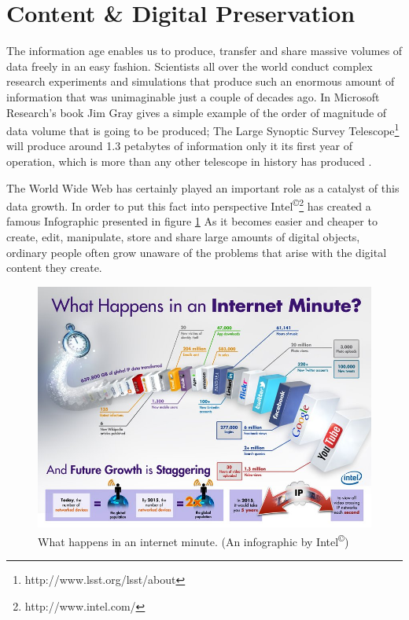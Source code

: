 \section{Content \& Digital Preservation}
The information age enables us to produce, transfer and share massive volumes of data freely in an easy fashion. Scientists all over the world conduct complex research experiments and simulations that produce such an enormous amount of information that was unimaginable just a couple of decades ago. In Microsoft Research's book Jim Gray gives a simple example of the order of magnitude of data volume that is going to be produced; The Large Synoptic Survey Telescope\footnote{http://www.lsst.org/lsst/about} will produce around 1.3 petabytes of information only it its first year of operation, which is more than any other telescope in history has produced \cite{Gray:2009:fourthparadigm}.

The World Wide Web has certainly played an important role as a catalyst of this data growth. In order to put this fact into perspective Intel\textsuperscript{\copyright}\footnote{http://www.intel.com/} has created a famous Infographic presented in figure \ref{fig:intel_oneminute_internet}
As it becomes easier and cheaper to create, edit, manipulate, store and share large amounts of digital objects, ordinary people often grow unaware of the problems that arise with the digital content they create.

\begin{figure}[htb]
\begin{center}
\includegraphics[width=5in]{figures/introduction/intel_oneminute_internet.jpg}
\caption{What happens in an internet minute. (An infographic by Intel\textsuperscript{\copyright})}
\label{fig:intel_oneminute_internet}
\end{center}
\end{figure}

